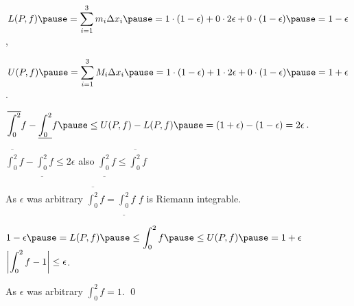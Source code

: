 \documentclass[10pt,aspectratio=149]{beamer}
\begin{document}
\begin{frame}

\begin{center}
\end{center}

\pause
\medskip

$\displaystyle
L(P,f)
\pause
= \sum_{i=1}^3 m_i \Delta x_i
\pause
=
1 \cdot (1-\epsilon) + 0 \cdot 2\epsilon + 0 \cdot (1-\epsilon)
\pause
= 1-\epsilon$,

\pause
\medskip

$\displaystyle
U(P,f)
\pause
= \sum_{i=1}^3 M_i \Delta x_i
\pause
=
1 \cdot (1-\epsilon) + 1 \cdot 2\epsilon + 0 \cdot (1-\epsilon)
\pause
= 1+\epsilon$.

\pause
\medskip

\thus\quad
$\displaystyle
\overline{\int_0^2} f - 
\underline{\int_0^2} f
\pause
\leq
U(P,f) - L(P,f)
\pause
=
(1+\epsilon)
- (1-\epsilon) = 2 \epsilon$.

\end{frame}

\begin{frame}
$\displaystyle \overline{\int_0^2} f - \underline{\int_0^2} f \leq 2 \epsilon$
\qquad
\pause
also
\qquad
$\displaystyle \underline{\int_0^2} f \leq \overline{\int_0^2} f$

\pause
\medskip

As $\epsilon$
was arbitrary
\pause
\wthus
$\displaystyle \overline{\int_0^2} f = \underline{\int_0^2} f$
\pause
\wthus
 $f$ is Riemann integrable.

\pause
\bigskip

$\displaystyle
1-\epsilon
\pause
= L(P,f)
\pause
\leq \int_0^2 f
\pause
\leq U(P,f)
\pause
=
1+\epsilon$
\pause
\wthus
$\displaystyle\biggl\lvert {\int_0^2 f - 1 } \biggr\rvert \leq \epsilon$.

\pause
\medskip

As $\epsilon$ was arbitrary
\pause
\wthus
$\displaystyle \int_0^2 f = 1$.
\qed

\end{frame}
\end{document}
